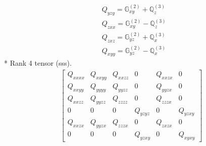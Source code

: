 \documentclass[fleqn,8pt,landscape]{jsarticle}
\begin{document}
\begin{align*}
& Q_{yzy} = \mathbb{G}_{xy}^{(2)} + \mathbb{Q}_{z}^{(3)} \\
& Q_{zxx} = \mathbb{G}_{xy}^{(2)} - \mathbb{Q}_{z}^{(3)} \\
& Q_{zxz} = \mathbb{G}_{yz}^{(2)} + \mathbb{Q}_{x}^{(3)} \\
& Q_{xyy} = \mathbb{G}_{yz}^{(2)} - \mathbb{Q}_{x}^{(3)}
\end{align*}
* Rank 4 tensor (sss).
\begin{align*}
\begin{bmatrix} Q_{xxxx} & Q_{xxyy} & Q_{xxzz} & 0 & Q_{xxzx} & 0 \\ Q_{xxyy} & Q_{yyyy} & Q_{yyzz} & 0 & Q_{yyzx} & 0 \\ Q_{xxzz} & Q_{yyzz} & Q_{zzzz} & 0 & Q_{zzzx} & 0 \\ 0 & 0 & 0 & Q_{yzyz} & 0 & Q_{yzxy} \\ Q_{xxzx} & Q_{yyzx} & Q_{zzzx} & 0 & Q_{zxzx} & 0 \\ 0 & 0 & 0 & Q_{yzxy} & 0 & Q_{xyxy} \end{bmatrix}
\end{align*}
\end{document}

